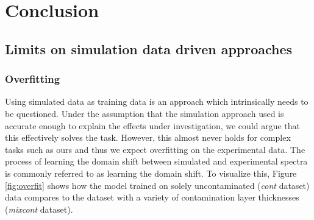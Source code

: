 


\chapter{Conclusion} %

\label{Chapter5} %


\section{Limits on simulation data driven approaches}

\subsection{Overfitting}
Using simulated data as training data is an approach which intrinsically needs to be questioned. Under the assumption that the simulation approach used is accurate enough to explain the effects under investigation, we could argue that this effectively solves the task. However, this almost never holds for complex tasks such as ours and thus we expect overfitting on the experimental data.
The process of learning the domain shift between simulated and experimental spectra is commonly referred to as learning the domain shift. To visualize this, Figure \ref{fig:overfit} shows how the model trained on solely uncontaminated (\emph{cont} dataset) data compares to the dataset with a variety of contamination layer thicknesses (\emph{mixcont} dataset).



\subsection{}
